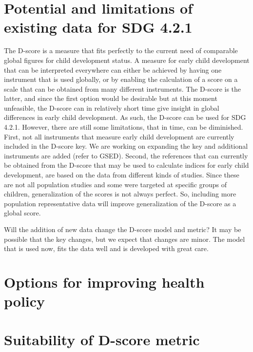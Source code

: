 \documentclass[
]{book}
\begin{document}
\hypertarget{potential-and-limitations-of-existing-data-for-sdg-4.2.1}{%
\section{Potential and limitations of existing data for SDG 4.2.1}\label{potential-and-limitations-of-existing-data-for-sdg-4.2.1}}

The D-score is a measure that fits perfectly to the current need of comparable global figures for child development status. A measure for early child development that can be interpreted everywhere can either be achieved by having one instrument that is used globally, or by enabling the calculation of a score on a scale that can be obtained from many different instruments. The D-score is the latter, and since the first option would be desirable but at this moment unfeasible, the D-score can in relatively short time give insight in global differences in early child development. As such, the D-score can be used for SDG 4.2.1. However, there are still some limitations, that in time, can be diminished. First, not all instruments that measure early child development are currently included in the D-score key. We are working on expanding the key and additional instruments are added (refer to GSED). Second, the references that can currently be obtained from the D-score that may be used to calculate indices for early child development, are based on the data from different kinds of studies. Since these are not all population studies and some were targeted at specific groups of children, generalization of the scores is not always perfect. So, including more population representative data will improve generalization of the D-score as a global score.

Will the addition of new data change the D-score model and metric? It may be possible that the key changes, but we expect that changes are minor. The model that is used now, fits the data well and is developed with great care.

\hypertarget{options-for-improving-health-policy}{%
\section{Options for improving health policy}\label{options-for-improving-health-policy}}

\hypertarget{suitability-of-d-score-metric}{%
\section{Suitability of D-score metric}\label{suitability-of-d-score-metric}}
\end{document}
